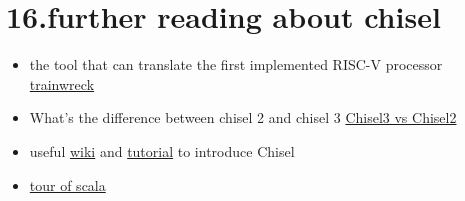 \documentclass[11pt]{article}
\begin{document}
\section*{16.further reading about chisel}
\begin{itemize}
	\item the tool that can translate
	the first implemented RISC-V processor  \href{https://github.com/aswaterman/trainwreck}{trainwreck}
	\item What's the difference between chisel 2 and chisel 3
	\href{https://github.com/freechipsproject/chisel3/wiki/Chisel3-vs-Chisel2}{Chisel3 vs Chisel2}
	\item  useful \href{https://github.com/freechipsproject/chisel3/wiki}{wiki} and \href{https://github.com/ucb-bar/chisel-tutorial/wiki}{tutorial} to introduce Chisel
	\item \href{https://docs.scala-lang.org/tour/tour-of-scala.html}{tour of scala}
\end{itemize}
 
\end{document}
